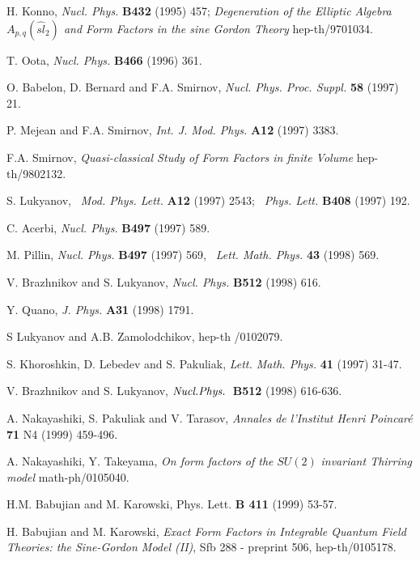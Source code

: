 \documentclass[a4paper,12pt]{article}
\begin{document}
\begin{thebibliography}{99}
  H. Konno, \emph{Nucl. Phys.} \textbf{B432} (1995) 457; 
\newline
\emph{Degeneration of the Elliptic Algebra $A_{p,q}(\hat{sl}_{2})$ and Form
Factors in the sine Gordon Theory} hep-th/9701034.

  T. Oota, \emph{Nucl. Phys.} \textbf{B466} (1996) 361.

  O. Babelon, D. Bernard and F.A. Smirnov, \emph{Nucl. Phys.
Proc. Suppl.} \textbf{58} (1997) 21.

  P. Mejean and F.A. Smirnov, \emph{Int. J. Mod. Phys.} \textbf{%
A12} (1997) 3383.

  F.A. Smirnov, \emph{Quasi-classical Study of Form Factors in
finite Volume} hep-th/9802132.

  S. Lukyanov, \emph{\ Mod. Phys. Lett.} \textbf{A12} (1997)
2543; \emph{\ Phys. Lett.} \textbf{B408} (1997) 192.

  C. Acerbi, \emph{Nucl. Phys.} \textbf{B497} (1997) 589.

  M. Pillin, \emph{Nucl. Phys.} \textbf{B497} (1997) 569, \emph{%
\ Lett. Math. Phys. } \textbf{43} (1998) 569.

  V. Brazhnikov and S. Lukyanov, \emph{Nucl. Phys.} \textbf{%
B512} (1998) 616.

  Y. Quano, \emph{J. Phys.} \textbf{A31} (1998) 1791.

  S Lukyanov and A.B. Zamolodchikov, hep-th /0102079.

  S. Khoroshkin, D. Lebedev and S. Pakuliak, \emph{Lett. Math.
Phys. }\textbf{41} (1997) 31-47.

  V. Brazhnikov and S. Lukyanov, $\emph{Nucl.Phys.}$\textbf{\
B512} (1998) 616-636.

  A. Nakayashiki, S. Pakuliak and V. Tarasov, \emph{Annales de
l'Institut Henri Poincar\'{e} }\textbf{71 }N4 (1999) 459-496.

  A. Nakayashiki, Y. Takeyama, \emph{On form factors of the }$%
SU(2)$ \emph{invariant Thirring model }math-ph/0105040.

  H.M. Babujian and M. Karowski, Phys. Lett. \textbf{B 411}
(1999) 53-57.

  H. Babujian and M. Karowski, \emph{Exact Form Factors in
Integrable Quantum Field Theories: the Sine-Gordon Model (II)}, Sfb 288 -
preprint 506, hep-th/0105178.


\end{thebibliography}
\end{document}
